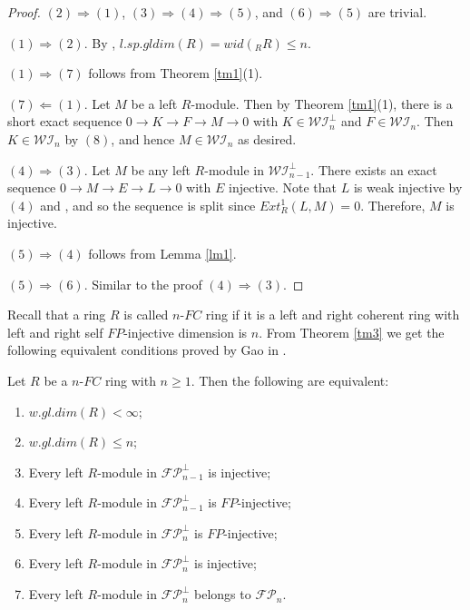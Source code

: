 ﻿\documentclass[
11pt,%
tightenlines,%
twoside,%
onecolumn,%
nofloats,%
nobibnotes,%
nofootinbib,%
superscriptaddress,%
noshowpacs,%
centertags]%
{revtex4}
\begin{document}
\begin{proof}

$(2) \Rightarrow (1)$, $(3) \Rightarrow (4) \Rightarrow (5)$, and $(6) \Rightarrow (5)$ are trivial.

 $(1) \Rightarrow (2)$. By \cite[Proposition $4.2$]{Gao1}, $l.sp.gldim(R) = wid(_RR) \leq n$.

 $(1) \Rightarrow (7)$ follows from Theorem \ref{tm1}(1).

 $(7) \Leftarrow (1)$. Let $M$ be a left $R$-module. Then by Theorem \ref{tm1}(1),
 there is a short exact sequence $0 \rightarrow K \rightarrow F \rightarrow M \rightarrow 0$
  with $K \in \mathcal{WI}_n^\bot$ and $F \in \mathcal{WI}_n$. Then $K \in \mathcal{WI}_n$
  by $(8)$, and hence $M \in \mathcal{WI}_n$ as desired.

$(4) \Rightarrow (3)$. Let $M$ be any left $R$-module in $\mathcal{WI}_{n-1}^\bot$.
There exists an exact sequence $0 \rightarrow M \rightarrow E \rightarrow L \rightarrow 0$ with $E$
injective. Note that $L$ is weak injective by $(4)$ and \cite[Proposition $3.3$]{Gao}, and so the
sequence is split since $Ext_R^1(L, M) = 0$. Therefore, $M$ is injective.

 $(5) \Rightarrow (4)$ follows from Lemma \ref{lm1}.

 $(5) \Rightarrow (6)$. Similar to the proof $(4) \Rightarrow (3)$.
\end{proof}

 Recall that a ring $R$ is called $n$-$FC$ ring if it is a left and right coherent
 ring with left and
right self $FP$-injective dimension is $n$. From Theorem \ref{tm3} we get the following
equivalent conditions proved by Gao in \cite[Theorem $3.6$]{Gao0}.

\begin{corollary}
Let $R$ be a $n$-$FC$ ring with $n \geq 1$. Then the following are equivalent:
\begin{enumerate}
\item $w. gl.dim(R) < \infty$;
\item $w. gl.dim(R) \leq n$;
\item Every left $R$-module in $\mathcal{FP}_{n-1}^\bot$ is injective;
\item Every left $R$-module in $\mathcal{FP}_{n-1}^\bot$ is $FP$-injective;
\item Every left $R$-module in $\mathcal{FP}_{n}^\bot$ is $FP$-injective;
\item Every left $R$-module in $\mathcal{FP}_{n}^\bot$ is injective;
\item Every left $R$-module in $\mathcal{FP}_{n}^\bot$ belongs to $\mathcal{FP}_{n}$.
\end{enumerate}
\end{corollary}
\end{document}
